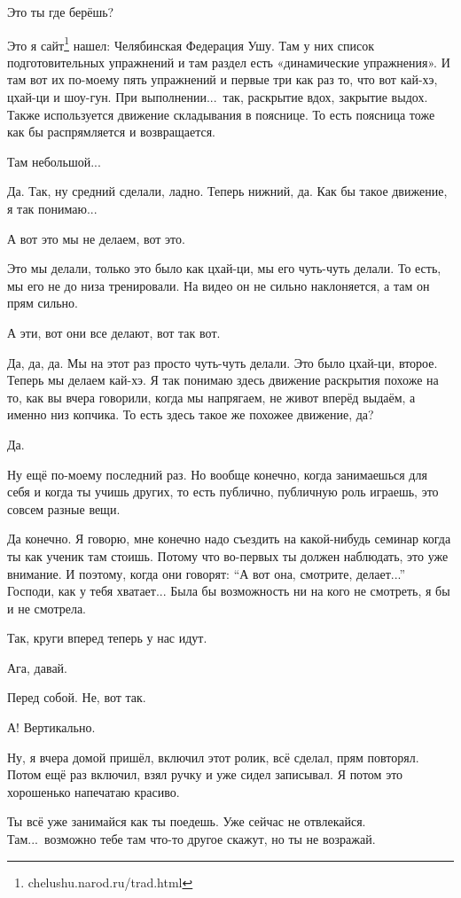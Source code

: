 \M
Это ты где берёшь?

\I
Это я сайт\footnote*{\tentt chelushu.narod.ru/trad.html} нашел: Челябинская Федерация Ушу.
Там у них список подготовительных упражнений и там
раздел есть «динамические упражнения». И
там вот их по-моему пять упражнений и первые три как раз то, что вот кай-хэ, цхай-ци и шоу-гун.
При выполнении...\ так, раскрытие вдох, закрытие выдох.
Также используется движение складывания в пояснице.
То есть поясница тоже как бы распрямляется и возвращается.

\M
Там небольшой...

\I
Да. Так, ну средний сделали, ладно. Теперь нижний, да. Как
бы такое движение, я так понимаю...

\M
А вот это мы не делаем, вот это.

\I
Это мы делали, только это было как цхай-ци, мы его
чуть-чуть делали. То есть, мы его не до
низа тренировали.
На видео он не сильно наклоняется, а там он прям сильно.

\M
А эти, вот они все делают, вот так вот.

\I
Да, да, да.
Мы на этот раз просто чуть-чуть делали.
Это было цхай-ци, второе.
Теперь мы делаем кай-хэ.
Я так понимаю здесь движение раскрытия похоже на то, как вы вчера говорили,
когда мы напрягаем, не живот вперёд выдаём, а именно низ копчика.
То есть здесь такое же похожее движение, да?

\M
Да.

\I
Ну ещё по-моему последний раз.
Но вообще
конечно, когда занимаешься для себя и когда ты учишь других, то есть публично, публичную роль
играешь, это совсем разные вещи.

\M
Да конечно.
Я говорю, мне конечно надо съездить на какой-нибудь семинар когда ты как ученик там стоишь.
Потому что во-первых ты должен наблюдать, это уже внимание.
И поэтому, когда они говорят: ``А вот она,
смотрите, делает...'' Господи, как у тебя хватает... Была бы возможность ни на кого не смотреть,
я бы и не смотрела.

\I
Так, круги вперед теперь у нас идут.

\M
Ага, давай.

\I
Перед собой. Не, вот так.

\M
А! Вертикально.

\I
Ну, я вчера домой пришёл, включил этот ролик, всё сделал, прям повторял.
Потом ещё раз включил, взял ручку и уже сидел записывал. Я потом это хорошенько напечатаю красиво.

\M
Ты всё уже занимайся как ты поедешь.
Уже сейчас не отвлекайся. Там...\ возможно тебе там что-то другое скажут, но ты не возражай.

